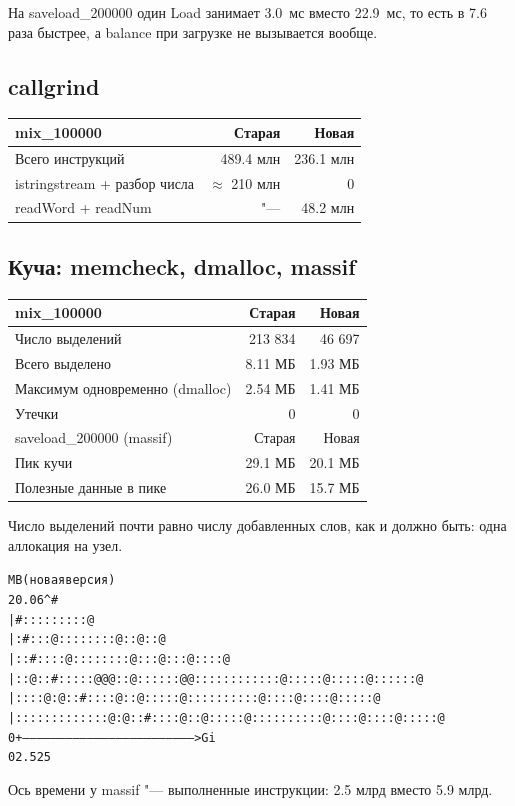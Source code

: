 На {\ttfamily saveload\_200000} один {\ttfamily Load} занимает 3.0~мс вместо 22.9~мс, то есть в 7.6 раза
быстрее, а {\ttfamily balance} при загрузке не вызывается вообще.

\subsection{callgrind}
\begin{longtable}{|l|r|r|}
\hline
\rowcolor{lightgray}
{\ttfamily mix\_100000} & Старая & Новая\\
\hline
Всего инструкций & 489.4 млн & 236.1 млн\\
{\ttfamily istringstream} + разбор числа & $\approx$ 210 млн & 0\\
{\ttfamily readWord} + {\ttfamily readNum} & "--- & 48.2 млн\\
\hline
\end{longtable}

\subsection{Куча: memcheck, dmalloc, massif}
\begin{longtable}{|l|r|r|}
\hline
\rowcolor{lightgray}
{\ttfamily mix\_100000} & Старая & Новая\\
\hline
Число выделений & 213 834 & 46 697\\
Всего выделено & 8.11 МБ & 1.93 МБ\\
Максимум одновременно (dmalloc) & 2.54 МБ & 1.41 МБ\\
Утечки & 0 & 0\\
\hline
\rowcolor{lightgray}
{\ttfamily saveload\_200000} (massif) & Старая & Новая\\
\hline
Пик кучи & 29.1 МБ & 20.1 МБ\\
Полезные данные в пике & 26.0 МБ & 15.7 МБ\\
\hline
\end{longtable}

Число выделений почти равно числу добавленных слов, как и должно быть: одна аллокация на узел.

\begin{alltt}
    MB                                                     (новая версия)
20.06^                    #
     |                    #     :    :     :    :     :     :    ::    :     @
     |                   :#   :::    @    ::   ::    ::    ::   @::   @:    :@
     |                  ::#   :::   :@   :::   ::   :::   @::  :@::  :@:  :::@
     |               ::@::#:::::@@@::@::::::@@::::::::::::@:::::@:::::@::::::@
     |          ::::@: @::#: :::@  ::@: ::::@ :::: ::::: :@::: :@:: ::@:: :::@
     | :::::::::::::@: @::#: :::@  ::@: ::::@ :::: ::::: :@::: :@:: ::@:: :::@
   0 +----------------------------------------------------------------------->Gi
     0                                                                   2.525
\end{alltt}
Ось времени у {\ttfamily massif} "--- выполненные инструкции: 2.5 млрд вместо 5.9 млрд.

